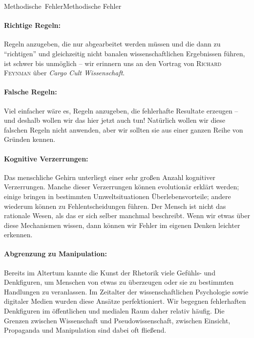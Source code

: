 



\unit{Methodische Fehler}{Methodische Fehler}

\paragraph{Richtige Regeln:}
Regeln anzugeben, die nur abgearbeitet werden müssen und die dann zu \enquote{richtigen}
und gleichzeitig nicht banalen
wissenschaftlichen Ergebnissen
führen, ist schwer bis unmöglich -- wir erinnern uns an den Vortrag von
\textsc{Richard Feynman} über \textit{Cargo Cult Wissenschaft}.

\paragraph{Falsche Regeln:}
Viel einfacher wäre es, Regeln anzugeben,
die fehlerhafte Resultate erzeugen -- und deshalb
wollen wir das hier jetzt auch tun!
Natürlich wollen wir diese falschen Regeln nicht anwenden, aber wir sollten sie
aus einer ganzen Reihe von Gründen kennen.


\paragraph{Kognitive Verzerrungen:}
Das menschliche Gehirn unterliegt einer sehr großen Anzahl kognitiver Verzerrungen.
Manche dieser Verzerrungen können evolutionär erklärt werden; einige bringen in bestimmten
Umweltsituationen Überlebensvorteile; andere wiederum können zu Fehlentscheidungen führen.
Der Mensch ist nicht das rationale Wesen, als das er sich selber manchmal beschreibt.
Wenn wir etwas über diese Mechanismen wissen, dann können wir Fehler im eigenen Denken leichter erkennen.

\paragraph{Abgrenzung zu Manipulation:}
Bereits im Altertum kannte die Kunst der Rhetorik viele Gefühls- und Denkfiguren,
um Menschen von etwas zu überzeugen oder sie zu bestimmten Handlungen zu veranlassen. 
Im Zeitalter der wissenschaftlichen Psychologie sowie
digitaler Medien wurden diese Ansätze perfektioniert. Wir begegnen fehlerhaften Denkfiguren im öffentli\-chen
und medialen Raum daher relativ häufig.
Die Grenzen zwischen Wissenschaft und Pseudowissenschaft, zwischen Einsicht, Propaganda und Manipulation 
sind dabei oft fließend.


